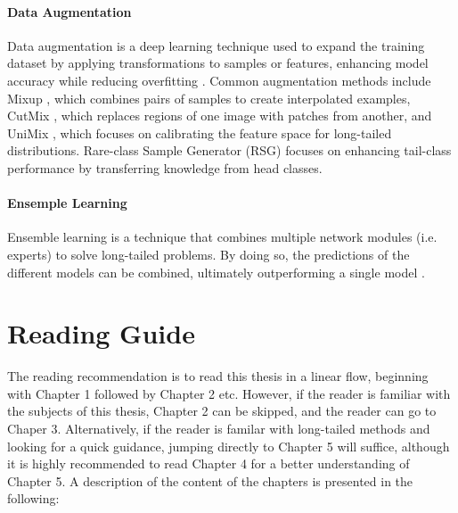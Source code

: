 \paragraph{Data Augmentation}
Data augmentation is a deep learning technique used to expand the training dataset by applying transformations to samples or features, enhancing model accuracy while reducing overfitting \cite{perez2017effectivenessdataaugmentationimage,shorten2019survey}. Common augmentation methods include Mixup \cite{zhang2018mixupempiricalriskminimization}, which combines pairs of samples to create interpolated examples, CutMix \cite{yun2019cutmixregularizationstrategytrain}, which replaces regions of one image with patches from another, and UniMix \cite{xu2021calibratedmodellongtailedvisual}, which focuses on calibrating the feature space for long-tailed distributions. Rare-class Sample Generator (RSG) \cite{wang2021rsgsimpleeffectivemodule} focuses on enhancing tail-class performance by transferring knowledge from head classes.


\paragraph{Ensemple Learning}
Ensemble learning is a technique that combines multiple network modules (i.e. experts) to solve long-tailed problems. By doing so, the predictions of the different models can be combined, ultimately outperforming a single model \cite{zhou2020bbnbilateralbranchnetworkcumulative,wang2022longtailedrecognitionroutingdiverse}.



\section{Reading Guide}

The reading recommendation is to read this thesis in a linear flow, beginning with Chapter 1 followed by Chapter 2 etc. However, if the reader is familiar with the subjects of this thesis, Chapter 2 can be skipped, and the reader can go to Chaper 3. Alternatively, if the reader is familar with long-tailed methods and looking for a quick guidance, jumping directly to Chapter 5 will suffice, although it is highly recommended to read Chapter 4 for a better understanding of Chapter 5.
A description of the content of the chapters is presented in the following:
\vspace{1em}

